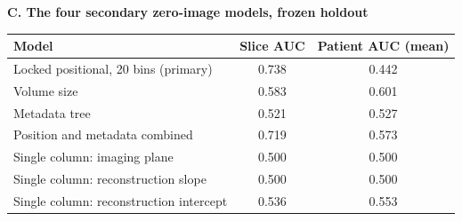 \documentclass[11pt,letterpaper]{article}
\begin{document}
\begin{singlespace}
\vspace{0.6em}

\textbf{C. The four secondary zero-image models, frozen holdout}

\vspace{0.3em}

\begin{tabular}{lcc}
\toprule
Model & Slice AUC & Patient AUC (mean)\\
\midrule
Locked positional, 20 bins (primary)      & 0.738 & 0.442\\
Volume size                               & 0.583 & 0.601\\
Metadata tree                             & 0.521 & 0.527\\
Position and metadata combined            & 0.719 & 0.573\\
Single column: imaging plane              & 0.500 & 0.500\\
Single column: reconstruction slope       & 0.500 & 0.500\\
Single column: reconstruction intercept   & 0.536 & 0.553\\
\bottomrule
\end{tabular}


\end{singlespace}
\end{document}
